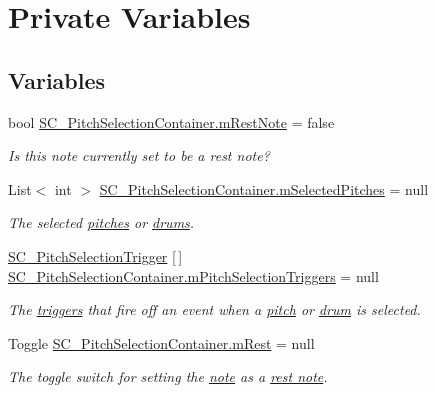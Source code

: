 \hypertarget{group___s_c___p_s_c_priv_var}{}\section{Private Variables}
\label{group___s_c___p_s_c_priv_var}
\subsection*{Variables}
\begin{DoxyCompactItemize}
\item 
bool \hyperlink{group___s_c___p_s_c_priv_var_ga6eec175f775c35e2d0eb51dfe6def49f}{S\+C\+\_\+\+Pitch\+Selection\+Container.\+m\+Rest\+Note} = false
\begin{DoxyCompactList}\small\item\em Is this note currently set to be a rest note? \end{DoxyCompactList}\item 
List$<$ int $>$ \hyperlink{group___s_c___p_s_c_priv_var_ga5a8a5c31158f6af7f0c17d4fd03c5641}{S\+C\+\_\+\+Pitch\+Selection\+Container.\+m\+Selected\+Pitches} = null
\begin{DoxyCompactList}\small\item\em The selected \hyperlink{group___music_enums_ga508f69b199ea518f935486c990edac1d}{pitches} or \hyperlink{group___music_enums_gade475b4382c7066d1af13e7c13c029b6}{drums}. \end{DoxyCompactList}\item 
\hyperlink{class_s_c___pitch_selection_trigger}{S\+C\+\_\+\+Pitch\+Selection\+Trigger} \mbox{[}$\,$\mbox{]} \hyperlink{group___s_c___p_s_c_priv_var_ga8431846d376b98bc6de5a872cce2c596}{S\+C\+\_\+\+Pitch\+Selection\+Container.\+m\+Pitch\+Selection\+Triggers} = null
\begin{DoxyCompactList}\small\item\em The \hyperlink{group___doc_s_c___p_s_t}{triggers} that fire off an event when a \hyperlink{group___music_enums_ga508f69b199ea518f935486c990edac1d}{pitch} or \hyperlink{group___music_enums_gade475b4382c7066d1af13e7c13c029b6}{drum} is selected. \end{DoxyCompactList}\item 
Toggle \hyperlink{group___s_c___p_s_c_priv_var_gae4378d4e0b53501eb0f55b8af38a5a8c}{S\+C\+\_\+\+Pitch\+Selection\+Container.\+m\+Rest} = null
\begin{DoxyCompactList}\small\item\em The toggle switch for setting the \hyperlink{group___music_structs_struct_music_1_1_combined_note}{note} as a \hyperlink{group___doc_s_c___p_s_c_DocSC_PSCRest}{rest note}. \end{DoxyCompactList}\item 

\end{DoxyCompactItemize}
